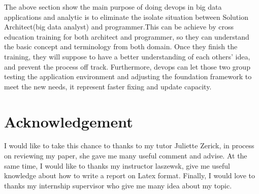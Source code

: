 \documentclass[sigconf]{acmart}
\begin{document}
The above section show the main purpose of doing devops in big data applications and analytic is to eliminate the isolate situation between Solution Architect(big data analyst) and programmer.This can be achieve by cross education training for both architect and programmer, so they can understand the basic concept and terminology from both domain. Once they finish the training, they will suppose to have a better understanding of each others' idea, and prevent the process off track. Furthermore, devops can let those two group testing the application environment and adjusting the foundation framework to meet the new needs, it represent faster fixing and update capacity. 

\section{Acknowledgement}

I would like to  take this chance to thanks to my tutor Juliette Zerick, in process on reviewing my paper, she gave me many useful comment and advise. At the same time, I would like to thanks my instructor laszewsk, give me useful knowledge about how to write a report on Latex format. Finally, I would love to thanks my internship supervisor who give me many idea about my topic.







 
\end{document}
